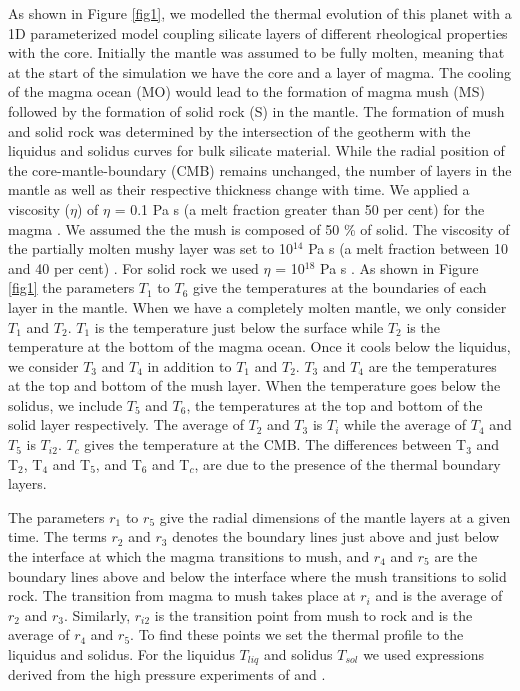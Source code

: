 \documentclass[fleqn,usenatbib]{mnras}
\begin{document}
As shown in Figure \ref{fig1}, we modelled the thermal evolution of this planet with a 1D parameterized model coupling silicate layers of different rheological properties with the core. Initially the mantle was assumed to be fully molten, meaning that at the start of the simulation we have the core and a layer of magma. The cooling of the magma ocean (MO) would lead to the formation of magma mush (MS) followed by the formation of solid rock (S) in the mantle. The formation of mush and solid rock was determined by the intersection of the geotherm with the liquidus and solidus curves for bulk silicate material. While the radial position of the core-mantle-boundary (CMB) remains unchanged, the number of layers in the mantle as well as their respective thickness change with time. We applied a viscosity ($\eta$) of $\eta$ = 0.1 Pa s (a melt fraction greater than 50 per cent) for the magma \citep{Xie2021, Losq2023}. We assumed the the mush is composed of  50 \% of solid. The viscosity of the partially molten mushy layer was set to 10$^{14}$ Pa s (a melt fraction between 10 and 40 per cent)  \citep{Xie2021, Losq2023}. For solid rock we used $\eta$ = 10$^{18}$ Pa s \citep{Ty2015}. As shown in Figure \ref{fig1} the parameters $T_{1}$ to $T_{6}$ give the temperatures at the boundaries of each layer in the mantle. When we have a completely molten mantle, we only consider $T_{1}$ and $T_{2}$. $T_{1}$ is the temperature just below the surface while $T_{2}$ is the temperature at the bottom of the magma ocean. Once it cools below the liquidus, we consider $T_{3}$ and $T_{4}$ in addition to $T_{1}$ and $T_{2}$. $T_{3}$ and $T_{4}$ are the temperatures at the top and bottom of the mush layer. When the temperature goes below the solidus, we include $T_{5}$ and $T_{6}$, the temperatures at the top and bottom of the solid layer respectively. The average of $T_{2}$ and $T_{3}$ is $T_{i}$ while the average of $T_{4}$ and $T_{5}$ is $T_{i2}$. $T_{c}$ gives the temperature at the CMB. The differences between T$_3$ and T$_2$, T$_4$ and T$_5$, and T$_6$ and T$_c$, are due to the presence of the thermal boundary layers. 

The parameters $r_{1}$ to $r_{5}$ give the radial dimensions of the mantle layers at a given time. The terms $r_{2}$ and $r_{3}$ denotes the boundary lines just above and just below the interface at which the magma transitions to mush, and $r_{4}$ and $r_{5}$ are the boundary lines above and below the interface where the mush transitions to solid rock. The transition from magma to mush takes place at $r_{i}$ and is the average of $r_{2}$ and $r_{3}$. Similarly, $r_{i2}$ is the transition point from mush to rock and is the average of $r_{4}$ and $r_{5}$. To find these points we set the thermal profile to the liquidus and solidus. For the liquidus $T_{liq}$ and solidus $T_{sol}$ we used expressions derived from the high pressure experiments of \cite{Fiq2010} and \cite{zhang1994}. 
\end{document}
